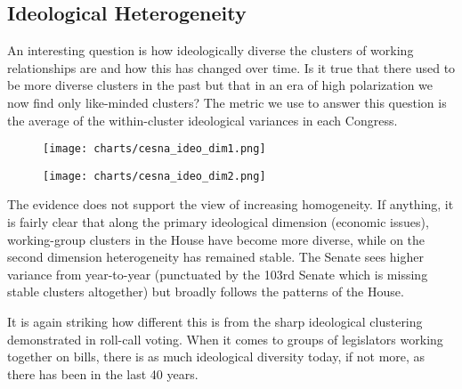 \subsection{Ideological Heterogeneity}

An interesting question is how ideologically diverse the clusters of working
relationships are and how this has changed over time. Is it true that there used
to be more diverse clusters in the past but that in an era of high polarization
we now find only like-minded clusters? The metric we use to answer this question
is the average of the within-cluster ideological variances in each Congress.

\begin{figure}[htbp]
  \centering
  \begin{minipage}[h]{0.4\textwidth}
    \texttt{[image: charts/cesna\_ideo\_dim1.png]}
  \end{minipage}
  \hfill
  \begin{minipage}[h]{0.4\textwidth}
    \texttt{[image: charts/cesna\_ideo\_dim2.png]}
  \end{minipage}
\end{figure}

The evidence does not support the view of increasing homogeneity. If anything,
it is fairly clear that along the primary ideological dimension (economic
issues), working-group clusters in the House have become more diverse, while on
the second dimension heterogeneity has remained stable. The Senate sees higher
variance from year-to-year (punctuated by the 103rd Senate which is missing
stable clusters altogether) but broadly follows the patterns of the House.

It is again striking how different this is from the sharp ideological clustering
demonstrated in roll-call voting. When it comes to groups of legislators working
together on bills, there is as much ideological diversity today, if not more, as
there has been in the last 40 years.
